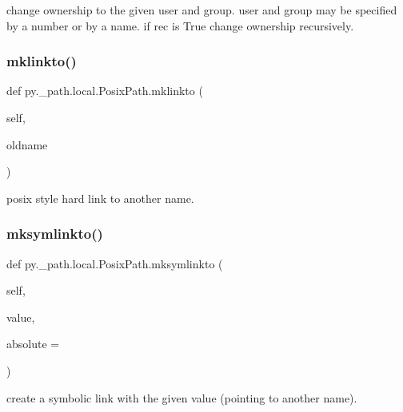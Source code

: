 \begin{DoxyVerb}change ownership to the given user and group.
    user and group may be specified by a number or
    by a name.  if rec is True change ownership
    recursively.
\end{DoxyVerb}
 \mbox{\label{classpy_1_1__path_1_1local_1_1_posix_path_aeeb54221c77afa4cf6e89aa0ec381e0a}} 
\subsubsection{\texorpdfstring{mklinkto()}{mklinkto()}}
{\footnotesize\ttfamily def py.\+\_\+path.\+local.\+Posix\+Path.\+mklinkto (\begin{DoxyParamCaption}\item[{}]{self,  }\item[{}]{oldname }\end{DoxyParamCaption})}

\begin{DoxyVerb}posix style hard link to another name. \end{DoxyVerb}
 \mbox{\label{classpy_1_1__path_1_1local_1_1_posix_path_ae6498265065f978e73d808d7ecd9ccea}} 
\subsubsection{\texorpdfstring{mksymlinkto()}{mksymlinkto()}}
{\footnotesize\ttfamily def py.\+\_\+path.\+local.\+Posix\+Path.\+mksymlinkto (\begin{DoxyParamCaption}\item[{}]{self,  }\item[{}]{value,  }\item[{}]{absolute = {} }\end{DoxyParamCaption})}

\begin{DoxyVerb}create a symbolic link with the given value (pointing to another name). \end{DoxyVerb}
 \mbox{\label{classpy_1_1__path_1_1local_1_1_posix_path_a84de60c88bf0a3c2ca992c74bc4688fe}} 
